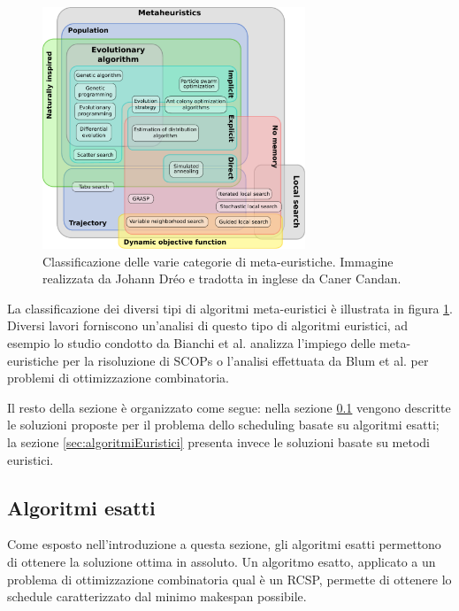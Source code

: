 \begin{figure}[b!]
 \begin{center}
  \includegraphics[width=0.7\textwidth]
  {capitoli/figure/cap2/MetaheuristicsClassification.pdf}
  \caption[Classificazione degi algoritmi meta-euristici]{Classificazione delle
  varie categorie di meta-euristiche. Immagine 
realizzata da Johann Dréo e tradotta in inglese da Caner Candan.}
\label{fig:metaheuristicsClassification}
 \end{center}
\end{figure}


La classificazione dei diversi tipi di algoritmi meta-euristici è illustrata in 
figura \ref{fig:metaheuristicsClassification}. Diversi lavori forniscono 
un'analisi di questo tipo di algoritmi euristici, ad esempio lo studio condotto 
da Bianchi et al. \cite{SurveyMetaheuristicSCOP} analizza l'impiego delle 
meta-euristiche per la risoluzione di \acp{SCOP} o l'analisi effettuata da Blum 
et al. \cite{MetaheuristicCombinatorialOptimization} per problemi di 
ottimizzazione combinatoria.

Il resto della sezione è organizzato come segue: nella sezione 
\ref{sec:algoritmiEsatti} vengono descritte le soluzioni proposte per il 
problema dello scheduling basate su algoritmi esatti; la sezione 
\ref{sec:algoritmiEuristici} presenta invece le soluzioni basate su metodi 
euristici.


\subsection{Algoritmi esatti}
\label{sec:algoritmiEsatti}
Come esposto nell'introduzione a questa sezione, gli algoritmi esatti 
permettono di ottenere la soluzione ottima in assoluto. Un algoritmo esatto, 
applicato a un problema di ottimizzazione combinatoria qual è un \ac{RCSP}, 
permette di ottenere lo schedule caratterizzato dal minimo makespan possibile. 

